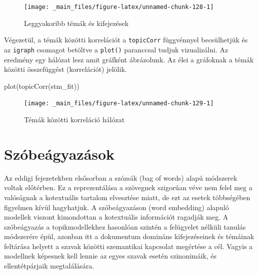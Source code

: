 \documentclass[
]{book}
\newenvironment{Shaded}{\begin{snugshade}}{\end{snugshade}}
\newcommand{\FunctionTok}[1]{\textcolor[rgb]{0.00,0.00,0.00}{#1}}
\newcommand{\NormalTok}[1]{#1}
\begin{document}
\begin{figure}

{\centering \texttt{[image: \_main\_files/figure-latex/unnamed-chunk-128-1]} 

}

\caption{Leggyakoribb témák és kifejezések}\label{fig:unnamed-chunk-128}
\end{figure}

Végezetül, a témák közötti korrelációt a \texttt{topicCorr} függvénnyel
becsülhetjük és az \texttt{igraph} csomagot betöltve a \texttt{plot()}
paranccsal tudjuk vizualizálni. Az eredmény egy hálózat lesz amit
gráfként ábrázolunk. Az élei a gráfoknak a témák közötti összefüggést
(korrelációt) jelölik.

\begin{Shaded}
\begin{Highlighting}[]

\FunctionTok{plot}\NormalTok{(}\FunctionTok{topicCorr}\NormalTok{(stm\_fit))}
\end{Highlighting}
\end{Shaded}

\begin{figure}

{\centering \texttt{[image: \_main\_files/figure-latex/unnamed-chunk-129-1]} 

}

\caption{Témák közötti korreláció hálózat}\label{fig:unnamed-chunk-129}
\end{figure}

\hypertarget{szuxf3beuxe1gyazuxe1sok}{%
\chapter{Szóbeágyazások}\label{szuxf3beuxe1gyazuxe1sok}}

Az eddigi fejezetekben elsősorban a szózsák (bag of words) alapú
módszerek voltak előtérben. Ez a reprezentálása a szövegnek szigorúan
véve nem felel meg a valóságnak a kotextuális tartalom elvesztése miatt,
de ezt az esetek többségében figyelmen kívül hagyhatjuk. A
szóbeágyazáson (word embedding) alapuló modellek viszont kimondottan a
kotextuális információt ragadják meg. A szóbeágyazás a topikmodellekhez
hasonlóan szintén a felügyelet nélküli tanulás módszerére épül, azonban
itt a dokumentum domináns kifejezéseinek és témáinak feltárása helyett a
szavak közötti szemantikai kapcsolat megértése a cél. Vagyis a modellnek
képesnek kell lennie az egyes szavak esetén szinonimáik, és
ellentétpárjaik megtalálására.
\end{document}
